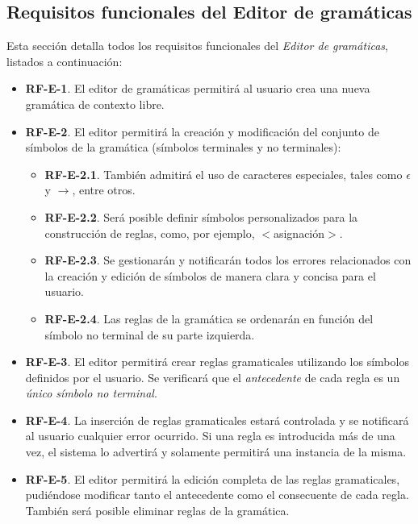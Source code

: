 \subsection{Requisitos funcionales del Editor de gramáticas}\label{sec:requisitos-funcionales-editor}

Esta sección detalla todos los requisitos funcionales del \textit{Editor de gramáticas}, listados a continuación:

\begin{itemize}
    \item \textbf{RF-E-1}. El editor de gramáticas permitirá al usuario crea una nueva gramática de contexto libre. 
    \item \textbf{RF-E-2}. El editor permitirá la creación y modificación del conjunto de símbolos de la gramática (símbolos terminales y no terminales):
    \begin{itemize}
      \item \textbf{RF-E-2.1}. También admitirá el uso de caracteres especiales, tales como $\epsilon$ y $\rightarrow$, entre otros.
    \item \textbf{RF-E-2.2}. Será posible definir símbolos personalizados para la construcción de reglas, como, por ejemplo, $<$asignación$>$.
    \item  \textbf{RF-E-2.3}. Se gestionarán y notificarán todos los errores relacionados con la creación y edición de símbolos de manera clara y concisa para el usuario.
    \item \textbf{RF-E-2.4}. Las reglas de la gramática se ordenarán en función del símbolo no terminal de su parte izquierda.
    \end{itemize}
    
\item \textbf{RF-E-3}. El editor permitirá crear reglas gramaticales utilizando los símbolos definidos por el usuario. Se verificará que el \textit{antecedente} de cada regla es un \textit{único símbolo no terminal}.

\item \textbf{RF-E-4}. La inserción de reglas gramaticales estará controlada y se notificará al usuario cualquier error ocurrido. Si una regla es introducida más de una vez, el sistema lo advertirá y solamente permitirá una instancia de la misma.

\item \textbf{RF-E-5}. El editor permitirá la edición completa de las reglas gramaticales, pudiéndose modificar tanto el antecedente como el consecuente de cada regla. También será posible eliminar reglas de la gramática.


\end{itemize}

